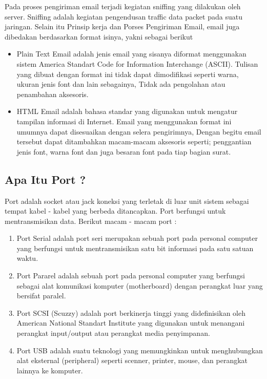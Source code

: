 Pada proses pengiriman email terjadi kegiatan sniffing yang dilakukan oleh server. Sniffing adalah kegiatan pengendusan traffic data packet pada suatu jaringan. 
Selain itu Prinsip kerja dan Porses Pengiriman Email, email juga dibedakan berdasarkan format isinya, yakni sebagai berikut
\begin{itemize} 
\item Plain Text Email adalah jenis email yang sisanya diformat menggunakan sistem America Standart Code for Information Interchange (ASCII). Tulisan yang dibuat dengan format ini tidak dapat dimodifikasi seperti warna, ukuran jenis font dan lain sebagainya, Tidak ada pengolahan atau penambahan aksesoris. 
\item HTML Email adalah bahasa standar yang digunakan untuk mengatur tampilan informasi di Internet. Email yang menggunakan format ini umumnya dapat disesuaikan dengan selera pengirimnya, Dengan begitu email tersebut dapat ditambahkan macam-macam aksesoris seperti; penggantian jenis font, warna font dan juga besaran font pada tiap bagian surat.
\end{itemize}
\subsection {Apa Itu Port ?} 
Port adalah socket atau jack koneksi yang terletak di luar unit sistem sebagai tempat kabel - kabel yang berbeda ditancapkan. Port berfungsi untuk mentransmisikan data. Berikut macam - macam port : 
\begin{enumerate}
\item Port Serial adalah port seri merupakan sebuah port pada personal computer yang berfungsi untuk mentransmisikan satu bit informasi pada satu satuan waktu. 
\item Port Pararel adalah sebuah port pada personal computer yang berfungsi sebagai alat komunikasi komputer (motherboard) dengan perangkat luar yang bersifat paralel. 
\item Port SCSI (Scuzzy) adalah port berkinerja tinggi yang didefinisikan oleh American National Standart Institute yang digunakan untuk menangani perangkat input/output atau perangkat media penyimpanan. 
\item Port USB adalah suatu teknologi yang memungkinkan untuk menghubungkan alat eksternal (peripheral) seperti scenner, printer, mouse, dan perangkat lainnya ke komputer. \par
\end{enumerate}
